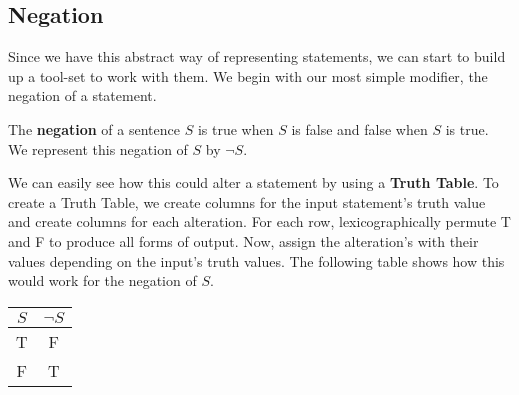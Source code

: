 \subsection{Negation}

Since we have this abstract way of representing statements, we can start to build up a tool-set to work with them.
We begin with our most simple modifier, the negation of a statement.

\begin{defn}
\label{defn:negation}
  The \textbf{negation} of a sentence $S$ is true when $S$ is false and false when $S$ is true.
  We represent this negation of $S$ by $\neg S$.
\end{defn}


We can easily see how this could alter a statement by using a \textbf{Truth Table}.
To create a Truth Table, we create columns for the input statement's truth value and create columns for each alteration.
For each row, lexicographically permute T and F to produce all forms of output.
Now, assign the alteration's with their values depending on the input's truth values.
The following table shows how this would work for the negation of $S$.

\begin{minipage}{\linewidth}
  \centering
  \begin{tabular}{cc}
    $S$ & $\neg S$ \\
    \toprule
    T & F \\
    F & T \\
  \end{tabular}
  \label{tab:negation} 
\end{minipage}


